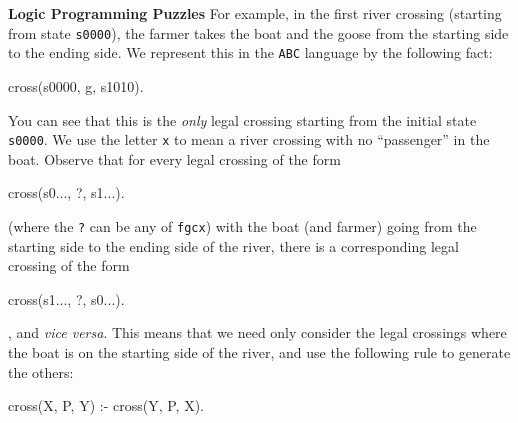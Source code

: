 \begin{minipage}[t]{\sw}
\slidenumber
\LARGE
{\bf Logic Programming Puzzles}\exx
For example, in the first river crossing
(starting from state \verb's0000'),
the farmer takes the boat and the goose
from the starting side to the ending side.
We represent this in the \verb'ABC' language by the following fact:
\begin{qv}
cross(s0000, g, s1010). %
\end{qv}
You can see that this is the {\em only} legal crossing
starting from the initial state \verb's0000'.
We use the letter \verb'x' to mean a river crossing
with no ``passenger'' in the boat.\exx
Observe that for every legal crossing of the form
\begin{qv}
cross(s0..., ?, s1...).
\end{qv}
(where the \verb'?' can be any of \verb'fgcx')
with the boat (and farmer) going from the starting side
to the ending side of the river,
there is a corresponding legal crossing of the form
\begin{qv}
cross(s1..., ?, s0...).
\end{qv},
and {\em vice versa}.
This means that we need only consider the legal crossings
where the boat is on the starting side of the river,
and use the following rule to generate the others:
\begin{qv}
cross(X, P, Y) :- cross(Y, P, X).
\end{qv}
\end{minipage}
